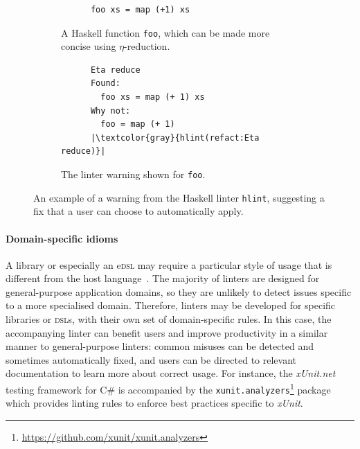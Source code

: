 \documentclass[../../main.tex]{subfiles}
\begin{document}
\begin{figure}[htbp]
  \vspace{3ex}
  \centering
  \begin{subfigure}{0.45\textwidth}
    \centering
    \begin{verbatim}
      foo xs = map (+1) xs
    \end{verbatim}
    \caption{A Haskell function \texttt{foo}, which can be made more concise using $\eta$-reduction.}
  \end{subfigure}
  \hfill
  \begin{subfigure}{0.45\textwidth}
    \centering
    \begin{verbatim}
      Eta reduce
      Found:
        foo xs = map (+ 1) xs
      Why not:
        foo = map (+ 1)
      |\textcolor{gray}{hlint(refact:Eta reduce)}|
    \end{verbatim}
    \caption{The linter warning shown for \texttt{foo}.}
  \end{subfigure}
  \caption{An example of a warning from the Haskell linter \texttt{hlint}, suggesting a fix that a user can choose to automatically apply.}
  \label{fig:hlint-example}
\end{figure}

\paragraph{Domain-specific idioms}
A library or especially an e\textsc{dsl} may require a particular style of usage that is different from the host language~\cite{hora_domain_2012}.
The majority of linters are designed for general-purpose application domains, so they are unlikely to detect issues specific to a more specialised domain.
Therefore, linters may be developed for specific libraries or \textsc{dsl}s, with their own set of domain-specific rules.
In this case, the accompanying linter can benefit users and improve productivity in a similar manner to general-purpose linters: common misuses can be detected and sometimes automatically fixed, and users can be directed to relevant documentation to learn more about correct usage.
For instance, the \emph{xUnit.net} testing framework for C\# is accompanied by the \texttt{xunit.analyzers}\footnote{\url{https://github.com/xunit/xunit.analyzers}} package which provides linting rules to enforce best practices specific to \emph{xUnit}.
\end{document}
